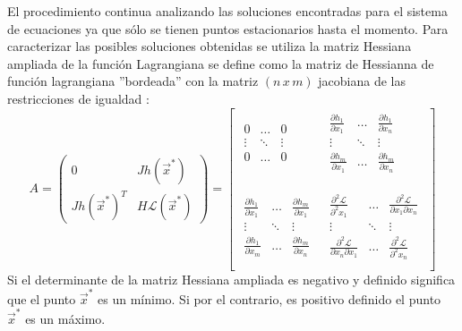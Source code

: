 El procedimiento continua analizando las soluciones encontradas para el sistema de ecuaciones ya que sólo se tienen puntos estacionarios hasta el momento. Para caracterizar las posibles soluciones obtenidas se utiliza la matriz Hessiana ampliada de la función Lagrangiana se define como la matriz de Hessianna de función lagrangiana ''bordeada''  con la  matriz $(n \,x\,m)$ jacobiana de las restricciones de igualdad \cite{blume1994mathematics}:
\begin{equation}
 A= \begin{pmatrix}
 0 &  J h(\vec{x}^*)\\
J h(\vec{x}^*)^T  & H\mathcal{L}(\vec{x}^*)
 \end{pmatrix}=
 \begin{bmatrix}
\begin{matrix}
0 & \ldots & 0 \\
\vdots & \ddots &\vdots \\
0 & \ldots & 0 \\
\end{matrix}
& 
\begin{matrix}
 \frac{\partial h_1}{\partial x_1}& \ldots &  \frac{\partial h_1}{\partial x_n} \\
\vdots & \ddots &\vdots \\
\frac{\partial h_m}{\partial x_1} & \ldots & \frac{\partial h_m}{\partial x_n} \\
\end{matrix}
\\
\\
\begin{matrix}
 \frac{\partial h_1}{\partial x_1}& \ldots &  \frac{\partial h_m}{\partial x_1} \\
\vdots & \ddots &\vdots \\
\frac{\partial h_1}{\partial x_m} & \ldots & \frac{\partial h_m}{\partial x_n} \\
\end{matrix}
&
\begin{matrix}
 \frac{\partial^2 \mathcal{L}}{\partial^2 x_1}& \ldots &  \frac{\partial^2 \mathcal{L}}{\partial x_1 \partial x_n} \\
\vdots & \ddots &\vdots \\
\frac{\partial^2 \mathcal{L}}{\partial x_n \partial x_1} & \ldots & \frac{\partial^2 \mathcal{L}}{\partial^2 x_n} \\
\end{matrix}
\end{bmatrix}
 \end{equation}
 Si el determinante de la matriz Hessiana ampliada es negativo y definido significa que el punto $\vec{x}^*$ es un mínimo. Si por el contrario, es positivo definido el punto $\vec{x}^*$ es un máximo. 
